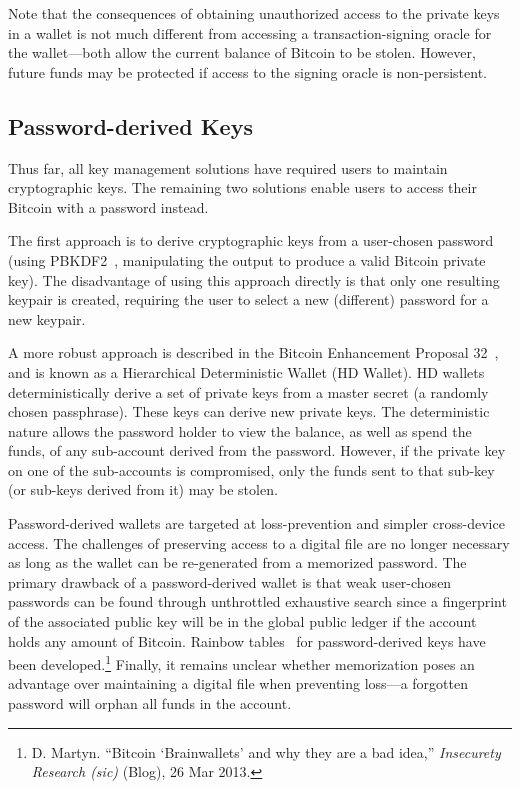 Note that the consequences of obtaining unauthorized access to the private keys in a wallet is not much different from accessing a transaction-signing oracle for the wallet---both allow the current balance of Bitcoin to be stolen. However, future funds may be protected if access to the signing oracle is non-persistent. 


\subsection{Password-derived Keys} 
Thus far, all key management solutions have required users to maintain cryptographic keys. The remaining two solutions enable users to access their Bitcoin with a password instead. 

The first approach is to derive cryptographic keys from a user-chosen password (\eg using PBKDF2~\cite{pbkdf2}, manipulating the output to produce a valid Bitcoin private key). The disadvantage of using this approach directly is that only one resulting keypair is created, requiring the user to select a new (different) password for a new keypair. 

A more robust approach is described in the Bitcoin Enhancement Proposal 32~\cite{bip32}, and is known as a Hierarchical Deterministic Wallet (HD Wallet). HD wallets deterministically derive a set of private keys from a master secret (a randomly chosen passphrase). These keys can derive new private keys. The deterministic nature allows the password holder to view the balance, as well as spend the funds, of any sub-account derived from the password. However, if the private key on one of the sub-accounts is compromised, only the funds sent to that sub-key (or sub-keys derived from it) may be stolen. 


Password-derived wallets are targeted at loss-prevention and simpler cross-device access. The challenges of preserving access to a digital file are no longer necessary as long as the wallet can be re-generated from a memorized password. The primary drawback of a password-derived wallet is that weak user-chosen passwords can be found through unthrottled exhaustive search since a fingerprint of the associated public key will be in the global public ledger if the account holds any amount of Bitcoin. Rainbow tables~\cite{oechslin2003making} for password-derived keys have been  developed.\footnote{D. Martyn. ``Bitcoin `Brainwallets' and why they are a bad idea,'' \textit{Insecurety Research \emph{(sic)}} (Blog), 26 Mar 2013.} Finally, it remains unclear whether memorization poses an advantage over maintaining a digital file when preventing loss---a forgotten password will orphan all funds in the account.


